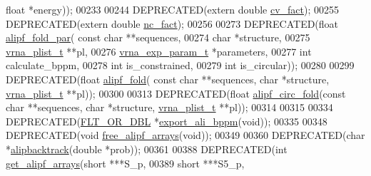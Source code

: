 \begin{DoxyCode}
{      float} *energy));
00233 
00244 DEPRECATED(\textcolor{keyword}{extern}  \textcolor{keywordtype}{double}  \hyperlink{group__consensus__fold_gaf3cbac6ff5d706d6e414677841ddf94c}{cv\_fact});
00255 DEPRECATED(\textcolor{keyword}{extern}  \textcolor{keywordtype}{double}  \hyperlink{group__consensus__fold_ga502948a122a2af5b914355b1f3ea2f61}{nc\_fact});
00256 
00273 DEPRECATED(\textcolor{keywordtype}{float} \hyperlink{group__consensus__pf__fold_ga5e8d54e41bf3d5b6e535d5bdb33c416e}{alipf\_fold\_par}( \textcolor{keyword}{const} \textcolor{keywordtype}{char} **sequences,
00274                       \textcolor{keywordtype}{char} *structure,
00275                       \hyperlink{group__data__structures_structvrna__plist__s}{vrna\_plist\_t} **pl,
00276                       \hyperlink{group__energy__parameters_structvrna__exp__param__s}{vrna\_exp\_param\_t} *parameters,
00277                       \textcolor{keywordtype}{int} calculate\_bppm,
00278                       \textcolor{keywordtype}{int} is\_constrained,
00279                       \textcolor{keywordtype}{int} is\_circular));
00280 
00299 DEPRECATED(\textcolor{keywordtype}{float} \hyperlink{group__consensus__pf__fold_gaa150d3ba7b009a1c27cb6f0eb197f6b4}{alipf\_fold}( \textcolor{keyword}{const} \textcolor{keywordtype}{char} **sequences, \textcolor{keywordtype}{char} *structure, 
      \hyperlink{group__data__structures_structvrna__plist__s}{vrna\_plist\_t} **pl));
00300 
00313 DEPRECATED(\textcolor{keywordtype}{float} \hyperlink{group__consensus__pf__fold_gaadd8d570442f86cbbc4978c8c62c9646}{alipf\_circ\_fold}(\textcolor{keyword}{const} \textcolor{keywordtype}{char} **sequences, \textcolor{keywordtype}{char} *structure, 
      \hyperlink{group__data__structures_structvrna__plist__s}{vrna\_plist\_t} **pl));
00314 
00315 
00334 DEPRECATED(\hyperlink{group__data__structures_ga31125aeace516926bf7f251f759b6126}{FLT\_OR\_DBL} *\hyperlink{group__consensus__pf__fold_ga11b6ab8bd9be1821fea352b190a01cab}{export\_ali\_bppm}(\textcolor{keywordtype}{void}));
00335 
00348 DEPRECATED(\textcolor{keywordtype}{void}  \hyperlink{group__consensus__pf__fold_ga0c0498f35686e26b38ee460d3db1a661}{free\_alipf\_arrays}(\textcolor{keywordtype}{void}));
00349 
00360 DEPRECATED(\textcolor{keywordtype}{char}  *\hyperlink{group__consensus__stochbt_ga0df40248788f0fb17ebdc59d74116d1c}{alipbacktrack}(\textcolor{keywordtype}{double} *prob));
00361 
00388 DEPRECATED(\textcolor{keywordtype}{int} \hyperlink{group__consensus__fold_ga5349960075b1847720a2e9df021e2675}{get\_alipf\_arrays}(\textcolor{keywordtype}{short} ***S\_p,
00389                      \textcolor{keywordtype}{short} ***S5\_p,

\end{DoxyCode}
